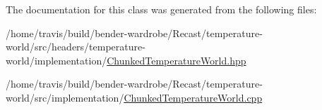 The documentation for this class was generated from the following files\-:\begin{DoxyCompactItemize}
\item 
/home/travis/build/bender-\/wardrobe/\-Recast/temperature-\/world/src/headers/temperature-\/world/implementation/\hyperlink{_chunked_temperature_world_8hpp}{Chunked\-Temperature\-World.\-hpp}\item 
/home/travis/build/bender-\/wardrobe/\-Recast/temperature-\/world/src/implementation/\hyperlink{_chunked_temperature_world_8cpp}{Chunked\-Temperature\-World.\-cpp}\end{DoxyCompactItemize}
